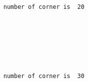 \documentclass[11pt]{article}
\begin{document}
    \begin{center}
    \end{center}
    { \hspace*{\fill} \\}
    
    \begin{center}
    \end{center}
    { \hspace*{\fill} \\}
    
    \begin{Verbatim}[commandchars=\\\{\}]


number of corner is  20

    \end{Verbatim}

    \begin{center}
    \end{center}
    { \hspace*{\fill} \\}
    
    \begin{center}
    \end{center}
    { \hspace*{\fill} \\}
    
    \begin{Verbatim}[commandchars=\\\{\}]


number of corner is  30

    \end{Verbatim}

    \begin{center}
    \end{center}
    { \hspace*{\fill} \\}
    
    \begin{center}
    \end{center}
    { \hspace*{\fill} \\}
    
\end{document}
